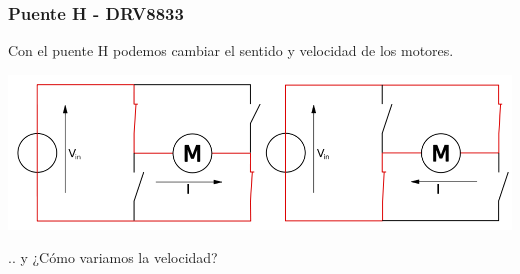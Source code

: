 \documentclass[compress]{beamer}
\begin{document}
\begin{frame}
 \frametitle{Puente H - DRV8833}
Con el puente H podemos cambiar el sentido y velocidad de los motores.
\begin{center}
 \includegraphics[width=\columnwidth]{./img/puenteH_2.png}
\end{center}
.. y ¿Cómo variamos la velocidad?

\end{frame}
\end{document}

